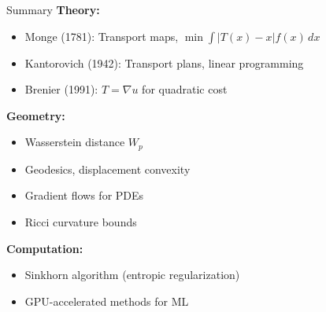 \documentclass[aspectratio=169]{beamer}
\begin{document}
\begin{frame}{Summary}
\textbf{Theory:}
\begin{itemize}
    \item Monge (1781): Transport maps, $\min \int |T(x)-x| f(x)\,dx$
    \item Kantorovich (1942): Transport plans, linear programming
    \item Brenier (1991): $T = \nabla u$ for quadratic cost
\end{itemize}

\vspace{0.3cm}
\textbf{Geometry:}
\begin{itemize}
    \item Wasserstein distance $W_p$
    \item Geodesics, displacement convexity
    \item Gradient flows for PDEs
    \item Ricci curvature bounds
\end{itemize}

\vspace{0.3cm}
\textbf{Computation:}
\begin{itemize}
    \item Sinkhorn algorithm (entropic regularization)
    \item GPU-accelerated methods for ML
\end{itemize}
\end{frame}
\end{document}

